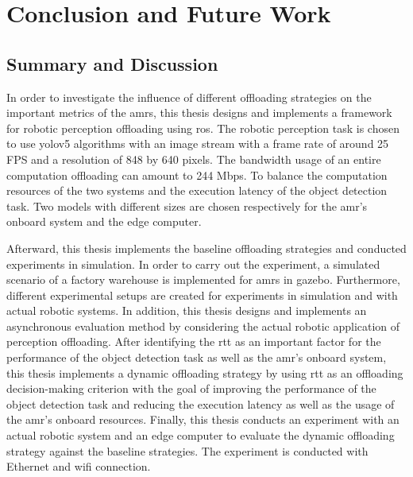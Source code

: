 \chapter{Conclusion and Future Work}\label{ch:conclusion}

\section{Summary and Discussion}\label{sec:discussion}

In order to investigate the influence of different offloading strategies on the important metrics of the \glspl{amr}, this thesis designs and implements a framework for robotic perception offloading using \gls{ros}. The robotic perception task is chosen to use \gls{yolo}v5 algorithms with an image stream with a frame rate of around 25 FPS and a resolution of 848 by 640 pixels. The bandwidth usage of an entire computation offloading can amount to 244 Mbps. To balance the computation resources of the two systems and the execution latency of the object detection task. Two models with different sizes are chosen respectively for the \gls{amr}'s onboard system and the edge computer. 

Afterward, this thesis implements the baseline offloading strategies and conducted experiments in simulation. In order to carry out the experiment, a simulated scenario of a factory warehouse is implemented for \glspl{amr} in \gls{gazebo}. Furthermore, different experimental setups are created for experiments in simulation and with actual robotic systems. In addition, this thesis designs and implements an asynchronous evaluation method by considering the actual robotic application of perception offloading. After identifying the \gls{rtt} as an important factor for the performance of the object detection task as well as the \gls{amr}'s onboard system, this thesis implements a dynamic offloading strategy by using \gls{rtt} as an offloading decision-making criterion with the goal of improving the performance of the object detection task and reducing the execution latency as well as the usage of the \gls{amr}'s onboard resources. Finally, this thesis conducts an experiment with an actual robotic system and an edge computer to evaluate the dynamic offloading strategy against the baseline strategies. The experiment is conducted with Ethernet and \gls{wifi} connection. 

